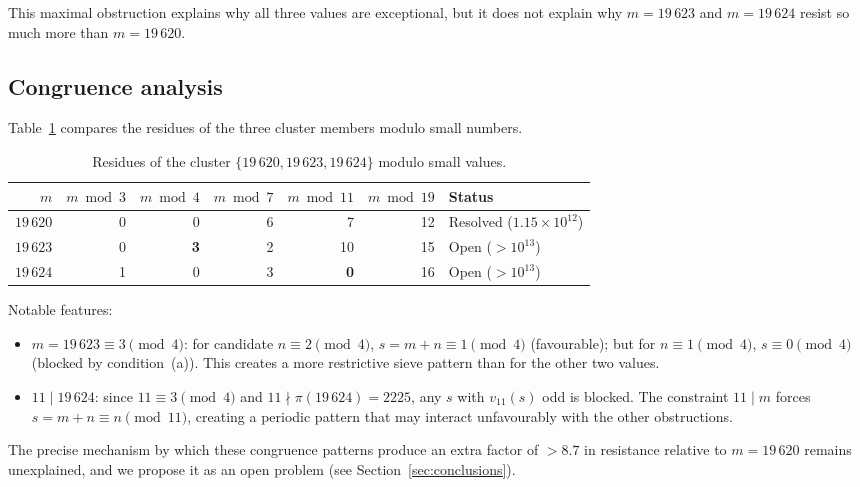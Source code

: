 \documentclass{amsart}
\theoremstyle{definition}
\theoremstyle{remark}
\numberwithin{equation}{section}
\newcommand{\vq}[1]{v_{#1}}
\begin{document}
This maximal obstruction explains why all three values are
exceptional, but it does not explain why $m = 19\,623$ and
$m = 19\,624$ resist so much more than $m = 19\,620$.

\subsection{Congruence analysis}

Table~\ref{tab:congruences} compares the residues of the three
cluster members modulo small numbers.

\begin{table}[ht]
\centering
\caption{Residues of the cluster $\{19\,620, 19\,623, 19\,624\}$
modulo small values.}
\label{tab:congruences}
\begin{tabular}{rrrrrrl}
\toprule
$m$ & $m \bmod 3$ & $m \bmod 4$ & $m \bmod 7$ & $m \bmod 11$
  & $m \bmod 19$ & Status \\
\midrule
$19\,620$ & 0 & 0 & 6 & 7 & 12 & Resolved ($1.15 \times 10^{12}$) \\
$19\,623$ & 0 & \textbf{3} & 2 & 10 & 15 & Open ($> 10^{13}$) \\
$19\,624$ & 1 & 0 & 3 & \textbf{0} & 16 & Open ($> 10^{13}$) \\
\bottomrule
\end{tabular}
\end{table}

Notable features:
\begin{itemize}
\item $m = 19\,623 \equiv 3 \pmod{4}$: for candidate
  $n \equiv 2 \pmod{4}$, $s = m + n \equiv 1 \pmod{4}$
  (favourable); but for $n \equiv 1 \pmod{4}$,
  $s \equiv 0 \pmod{4}$ (blocked by condition~(a)).
  This creates a more restrictive sieve pattern than for the other
  two values.
\item $11 \mid 19\,624$: since $11 \equiv 3 \pmod{4}$ and
  $11 \nmid \pi(19\,624) = 2225$, any $s$ with $\vq{11}(s)$ odd
  is blocked.  The constraint $11 \mid m$ forces
  $s = m + n \equiv n \pmod{11}$, creating a periodic pattern
  that may interact unfavourably with the other obstructions.
\end{itemize}

The precise mechanism by which these congruence patterns produce an
extra factor of $>8.7$ in resistance relative to $m = 19\,620$
remains unexplained, and we propose it as an open problem
(see Section~\ref{sec:conclusions}).

\end{document}
